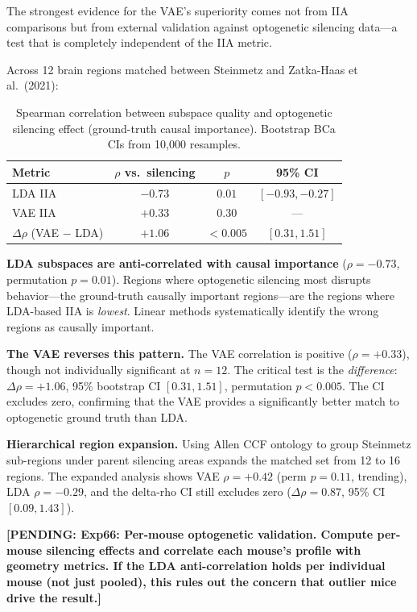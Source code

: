 \documentclass{article}
\newcommand{\pending}[1]{\textcolor{red!70!black}{\textbf{[PENDING: #1]}}}
\begin{document}
The strongest evidence for the VAE's superiority comes not from IIA comparisons but from external validation against optogenetic silencing data---a test that is completely independent of the IIA metric.

Across 12 brain regions matched between Steinmetz and Zatka-Haas et al.\ (2021):

\begin{table}[h]
\centering
\small
\caption{Spearman correlation between subspace quality and optogenetic silencing effect (ground-truth causal importance). Bootstrap BCa CIs from 10,000 resamples.}
\label{tab:silencing}
\begin{tabular}{lccc}
\toprule
Metric & $\rho$ vs.\ silencing & $p$ & 95\% CI \\
\midrule
LDA IIA & $-0.73$ & $0.01$ & $[-0.93, -0.27]$ \\
VAE IIA & $+0.33$ & $0.30$ & --- \\
$\Delta\rho$ (VAE $-$ LDA) & $+1.06$ & $< 0.005$ & $[0.31, 1.51]$ \\
\bottomrule
\end{tabular}
\end{table}

\textbf{LDA subspaces are anti-correlated with causal importance} ($\rho = -0.73$, permutation $p = 0.01$). Regions where optogenetic silencing most disrupts behavior---the ground-truth causally important regions---are the regions where LDA-based IIA is \emph{lowest}. Linear methods systematically identify the wrong regions as causally important.

\textbf{The VAE reverses this pattern.} The VAE correlation is positive ($\rho = +0.33$), though not individually significant at $n = 12$. The critical test is the \emph{difference}: $\Delta\rho = +1.06$, 95\% bootstrap CI $[0.31, 1.51]$, permutation $p < 0.005$. The CI excludes zero, confirming that the VAE provides a significantly better match to optogenetic ground truth than LDA.

\textbf{Hierarchical region expansion.} Using Allen CCF ontology to group Steinmetz sub-regions under parent silencing areas expands the matched set from 12 to 16 regions. The expanded analysis shows VAE $\rho = +0.42$ (perm $p = 0.11$, trending), LDA $\rho = -0.29$, and the delta-rho CI still excludes zero ($\Delta\rho = 0.87$, 95\% CI $[0.09, 1.43]$).

\pending{Exp66: Per-mouse optogenetic validation. Compute per-mouse silencing effects and correlate each mouse's profile with geometry metrics. If the LDA anti-correlation holds per individual mouse (not just pooled), this rules out the concern that outlier mice drive the result.}
\end{document}
